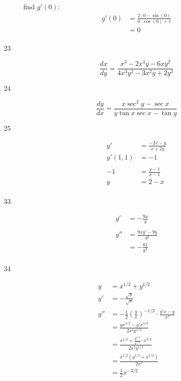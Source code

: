 \documentclass[letterpaper, landscape]{exam}
\begin{document}
\begin{description}
      find $g'(0)$:
      \begin{align*}
        g'(0) & = \frac{2 \cdot 0 - \sin (0) }{0 \cdot \cos (0) + 1} \\
              & = \boxed{ 0 } \\
      \end{align*}

    \item[23] 
      \[
        \frac{dx}{dy} = \frac{ x^3 - 2x^4y - 6xy^2 }{ 4x^3y^2 - 3x^2y + 2y^3 }
      \]

    \item[24] 
      \[
        \frac{dy}{dx} = \frac{x \sec^2 y - \sec x}{y \tan x \sec x - \tan y}
      \]

    \item[25] 
      \begin{align*}
        y'       & = \frac{ - 2x - y}{x + 2 y} \\
        y'(1, 1) & = -1 \\
        \\
        -1       & = \frac{y - 1}{x - 1} \\
        y        & = 2 - x \\
      \end{align*}

    \item[33]
      \begin{align*}
        y'  & = - \frac{9x}{y} \\
        \\
        y'' & = \frac{9xy' - 9y}{y^2} \\
            & = \boxed{ - \frac{81}{y^3} } \\
      \end{align*}

    \item[34] 
      \begin{align*}
        y   & = x^{1/2} + y^{1/2} \\
        y'  & = - \frac{\sqrt{y}}{\sqrt{x}} \\
        y'' & = - \frac{1}{2} \left( \frac{y}{x} \right)^{-1/2} \cdot \frac{y'x - y}{x^2} \\
            & =  \frac{yx^{1/2} - y'x^{3/2}}{2x^2y^{1/2}} \\
            & = \frac{ x^{1/2} + \frac{ y^{1/2} }{ x^{1/2} } \cdot x^{3/2} }{ 2x^2y^{1/2} } \\
            & = \frac{x^{1/2} \left( y^{1/2} + x^{1/2} \right)}{2x^2} \\
            & = \boxed{ \frac{1}{2} x^{-3/2} } \\
      \end{align*}


\end{description}
\end{document}
